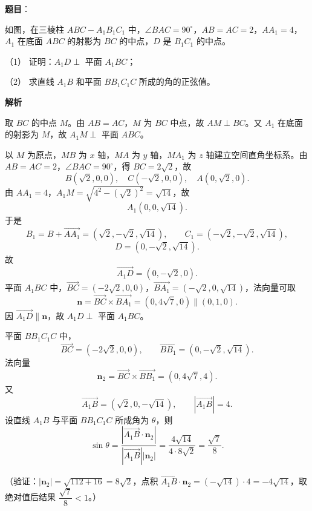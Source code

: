 \begin{answer}

\textbf{题目}：

如图，在三棱柱 \(ABC-A_1B_1C_1\) 中，\(\angle BAC=90^\circ\)，\(AB=AC=2\)，\(AA_1=4\)，\(A_1\) 在底面 \(ABC\) 的射影为 \(BC\) 的中点，\(D\) 是 \(B_1C_1\) 的中点。

（1） 证明：\(A_1D\perp\) 平面 \(A_1BC\)；

（2） 求直线 \(A_1B\) 和平面 \(BB_1C_1C\) 所成的角的正弦值。
\nopagebreak[4]
\begin{center}\end{center}
\nopagebreak[4]
\textbf{解析}


取 \(BC\) 的中点 \(M\)。由 \(AB=AC\)，\(M\) 为 \(BC\) 中点，故 \(AM\perp BC\)。又 \(A_1\) 在底面的射影为 \(M\)，故 \(A_1M\perp\) 平面 \(ABC\)。

以 \(M\) 为原点，\(MB\) 为 \(x\) 轴，\(MA\) 为 \(y\) 轴，\(MA_1\) 为 \(z\) 轴建立空间直角坐标系。由 \(AB=AC=2\)，\(\angle BAC=90^\circ\)，得 \(BC=2\sqrt2\)，故
\nopagebreak[4]
\[
B(\sqrt2,0,0),\quad C(-\sqrt2,0,0),\quad A(0,\sqrt2,0).
\]
由 \(AA_1=4\)，\(A_1M=\sqrt{4^2-(\sqrt2)^2}=\sqrt{14}\)，故
\nopagebreak[4]
\[
A_1(0,0,\sqrt{14}).
\]
于是
\nopagebreak[4]
\[
B_1=B+\overrightarrow{AA_1}=(\sqrt2,-\sqrt2,\sqrt{14}),\qquad
C_1=(-\sqrt2,-\sqrt2,\sqrt{14}),
\]
\nopagebreak[4]
\[
D=\left(0,-\sqrt2,\sqrt{14}\right).
\]
故
\nopagebreak[4]
\[
\overrightarrow{A_1D}=(0,-\sqrt2,0).
\]
平面 \(A_1BC\) 中，\(\overrightarrow{BC}=(-2\sqrt2,0,0)\)，\(\overrightarrow{BA_1}=(-\sqrt2,0,\sqrt{14})\)，法向量可取
\nopagebreak[4]
\[
\boldsymbol{n}=\overrightarrow{BC}\times\overrightarrow{BA_1}=(0,4\sqrt7,0)\parallel(0,1,0).
\]
因 \(\overrightarrow{A_1D}\parallel\boldsymbol{n}\)，故 \(A_1D\perp\) 平面 \(A_1BC\)。


平面 \(BB_1C_1C\) 中，
\nopagebreak[4]
\[
\overrightarrow{BC}=(-2\sqrt2,0,0),\qquad
\overrightarrow{BB_1}=(0,-\sqrt2,\sqrt{14}).
\]
法向量
\nopagebreak[4]
\[
\boldsymbol{n}_2=\overrightarrow{BC}\times\overrightarrow{BB_1}
=(0,4\sqrt7,4).
\]
又
\nopagebreak[4]
\[
\overrightarrow{A_1B}=(\sqrt2,0,-\sqrt{14}),\qquad |\overrightarrow{A_1B}|=4.
\]
设直线 \(A_1B\) 与平面 \(BB_1C_1C\) 所成角为 \(\theta\)，则
\nopagebreak[4]
\[
\sin\theta
=\frac{|\overrightarrow{A_1B}\cdot\boldsymbol{n}_2|}{|\overrightarrow{A_1B}||\boldsymbol{n}_2|}
=\frac{4\sqrt{14}}{4\cdot8\sqrt2}
=\frac{\sqrt7}{8}.
\]

（验证：\(|\boldsymbol{n}_2|=\sqrt{112+16}=8\sqrt2\)，点积 \(\overrightarrow{A_1B}\cdot\boldsymbol{n}_2=(-\sqrt{14})\cdot4=-4\sqrt{14}\)，取绝对值后结果 \(\dfrac{\sqrt7}{8}<1\)。）



\end{answer}
